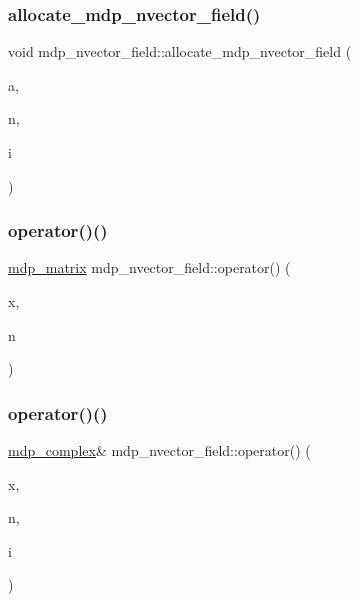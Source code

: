 \subsubsection{\texorpdfstring{allocate\+\_\+mdp\+\_\+nvector\+\_\+field()}{allocate\_mdp\_nvector\_field()}}
{\footnotesize\ttfamily void mdp\+\_\+nvector\+\_\+field\+::allocate\+\_\+mdp\+\_\+nvector\+\_\+field (\begin{DoxyParamCaption}\item[{\hyperlink{classmdp__lattice}{mdp\+\_\+lattice} \&}]{a,  }\item[{int}]{n,  }\item[{int}]{i }\end{DoxyParamCaption})\hspace{0.3cm}{\ttfamily [inline]}}

\mbox{\label{classmdp__nvector__field_afddf6115e2d88a72727d66949436d8ca}} 
\subsubsection{\texorpdfstring{operator()()}{operator()()}\hspace{0.1cm}{\footnotesize\ttfamily [1/3]}}
{\footnotesize\ttfamily \hyperlink{classmdp__matrix}{mdp\+\_\+matrix} mdp\+\_\+nvector\+\_\+field\+::operator() (\begin{DoxyParamCaption}\item[{\hyperlink{classmdp__site}{mdp\+\_\+site}}]{x,  }\item[{int}]{n }\end{DoxyParamCaption})\hspace{0.3cm}{\ttfamily [inline]}}

\mbox{\label{classmdp__nvector__field_acc1e3d8cd4ea65935ebb8db11f5df3f4}} 
\subsubsection{\texorpdfstring{operator()()}{operator()()}\hspace{0.1cm}{\footnotesize\ttfamily [2/3]}}
{\footnotesize\ttfamily \hyperlink{classmdp__complex}{mdp\+\_\+complex}\& mdp\+\_\+nvector\+\_\+field\+::operator() (\begin{DoxyParamCaption}\item[{\hyperlink{classmdp__site}{mdp\+\_\+site}}]{x,  }\item[{int}]{n,  }\item[{int}]{i }\end{DoxyParamCaption})\hspace{0.3cm}{\ttfamily [inline]}}

